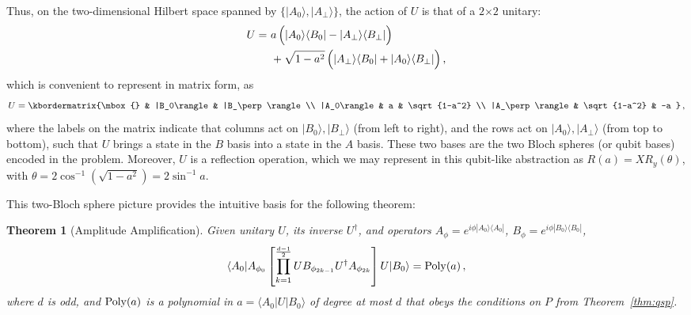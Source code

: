 \documentclass[aps,pra,showpacs,notitlepage,twocolumn,superscriptaddress,nofootinbib]{revtex4-1}
\newtheorem{theorem}{Theorem}
\def\>{\rangle}
\def\<{\langle}
\newcommand{\bea}{\begin{eqnarray}}
\newcommand{\eea}{\end{eqnarray}}
\begin{document}
    Thus, on the two-dimensional Hilbert space spanned by $\{|A_0\>, |A_\perp\>\}$, the action of $U$ is that of a $2$$\times$$2$ unitary:
        \begin{align}
            \begin{aligned}
                U =\  &a \left (\rule{0pt}{2.4ex} |A_0\>\<B_0| - |A_\perp\>\<B_\perp| \right) \\ 
                &+\sqrt{1-a^2} \left( \rule{0pt}{2.4ex} |A_\perp\>\<B_0| + |A_0\>\<B_\perp| \right),
            \end{aligned}
        \end{align}
    which is convenient to represent in matrix form, as
        \bea
            U = \kbordermatrix{\mbox{} & |B_0\rangle & |B_\perp \rangle \\
              |A_0\rangle & a    & \sqrt{1-a^2} \\ 
              |A_\perp \rangle & \sqrt{1-a^2} & -a 
            }
            \,,
            \label{eq:ampamp_rot}
        \eea
    where the labels on the matrix indicate that columns act on $|B_0\>, |B_\perp\>$ (from left to right), and the rows act on $|A_0\>, |A_\perp\>$ (from top to bottom), such that $U$ brings a state in the $B$ basis into a state in the $A$ basis.  These two bases are the two Bloch spheres (or qubit bases) encoded in the problem. Moreover, $U$ is a reflection operation, which we may represent in this qubit-like abstraction as $R(a) = X R_y(\theta)$, with $\theta = 2\cos^{-1}\left(\sqrt{1-a^2} \right) = 2\sin^{-1}a$.
    
    This two-Bloch sphere picture provides the intuitive basis for the following theorem:
        \begin{theorem}[Amplitude Amplification]
            Given unitary $U$, its inverse $U^\dagger$, and operators $A_\phi = e^{i\phi |A_0\>\<A_0|}$, $B_\phi = e^{i\phi |B_0\>\<B_0|}$, 
              \bea
                    \<A_0 | A_{\phi_0} \left[ \prod_{k=1}^{\frac{d-1}{2}} U B_{\phi_{2k-1}} U^\dagger A_{\phi_{2k}} \right] U |B_0\> = {\rm Poly}(a)\,,
                    \label{eq:thm_aa_qsp}
              \eea
            where $d$ is odd, and ${\rm Poly}(a)$ is a polynomial in $a = \<A_0|U|B_0\>$ of degree at most $d$ that obeys the conditions on $P$ from Theorem~\ref{thm:qsp}.
            \label{thm:aa}
        \end{theorem}
    
\end{document}
